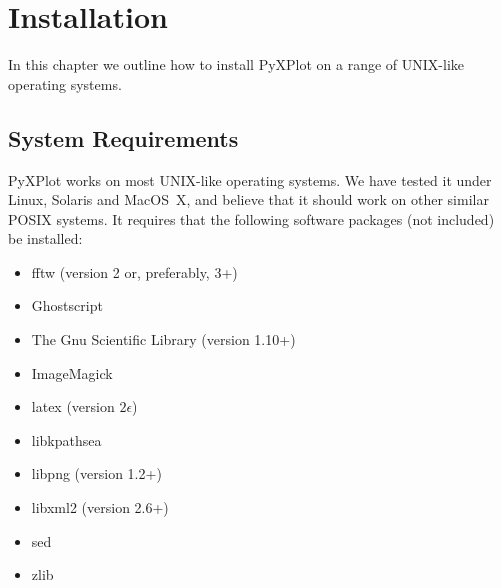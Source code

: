%
%
%
%
%



\chapter{Installation}

\label{ch:installation}

In this chapter we outline how to install PyXPlot on a range of UNIX-like
operating systems.

\section{System Requirements}

PyXPlot works on most UNIX-like operating systems. We have tested it under
Linux, Solaris and MacOS~X, and believe that it
should work on other similar POSIX systems. It requires that the following
software packages (not included) be installed:

\vspace{0.5cm}
\begin{itemize}
\item fftw (version 2 or, preferably, 3+) 
\item Ghostscript 
\item The Gnu Scientific Library (version 1.10+) 
\item ImageMagick 
\item latex (version $2\epsilon$) 
\item libkpathsea 
\item libpng (version 1.2+) 
\item libxml2 (version 2.6+) 
\item sed 
\item zlib 
\end{itemize}
\vspace{0.5cm}

